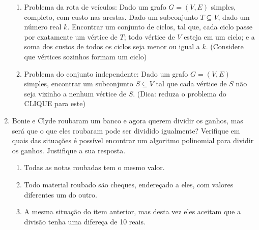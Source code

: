 \documentclass[12pt]{article}
\begin{document}
\begin{enumerate}
\begin{enumerate}

\item Problema da rota de veículos: Dado um grafo $G = (V,E)$ simples, completo, com custo nas arestas. Dado um subconjunto $T\subseteq V$, dado um número real $k$. Encontrar um conjunto de ciclos, tal que, cada ciclo passe por exatamente um vértice de $T$; todo vértice de $V$ esteja em um ciclo; e a soma dos custos de todos os ciclos seja menor ou igual a $k$. (Considere que vértices sozinhos formam um ciclo)

\item Problema do conjunto independente: Dado um grafo $G = (V,E)$ simples, encontrar um subconjunto $S\subseteq V$ tal que cada vértice de $S$ não seja vizinho a nenhum vértice de $S$. (Dica: reduza o problema do CLIQUE para este)

\end{enumerate}

\item Bonie e Clyde roubaram um banco e agora querem dividir os ganhos, mas será que o que eles roubaram pode ser dividido igualmente? 
Verifique em quais das situações é possível encontrar um algoritmo polinomial para dividir os ganhos.
Justifique a sua resposta.

\begin{enumerate}

\item Todas as notas roubadas tem o mesmo valor.

\item Todo material roubado são cheques, endereçado a eles, com valores diferentes um do outro.

\item A mesma situação do item anterior, mas desta vez eles aceitam que a divisão tenha uma difereça de 10 reais.

\end{enumerate}





\end{enumerate}
\end{document}
